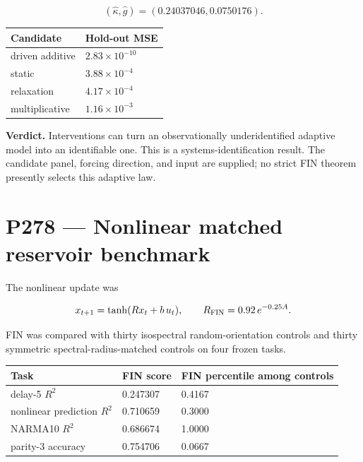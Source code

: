 \documentclass[11pt,a4paper,openany]{report}
\begin{document}
\[
(\widehat\kappa,\widehat g)
=
(0.24037046,0.0750176).
\]

\begin{center}
\begingroup\small
\setlength{\tabcolsep}{2.5pt}
\renewcommand{\arraystretch}{1.16}
\begin{longtable}{@{}p{}p{}@{}}
\toprule
\textbf{Candidate} & \textbf{Hold-out MSE} \\
\midrule
\endhead
driven additive & \(2.83\times10^{-10}\) \\
static & \(3.88\times10^{-4}\) \\
relaxation & \(4.17\times10^{-4}\) \\
multiplicative & \(1.16\times10^{-3}\) \\
\bottomrule
\end{longtable}
\endgroup
\end{center}

\textbf{Verdict.} Interventions can turn an observationally underidentified adaptive model into an identifiable one. This is a systems-identification result. The candidate panel, forcing direction, and input are supplied; no strict FIN theorem presently selects this adaptive law.

\chapter{P278 --- Nonlinear matched reservoir benchmark}

The nonlinear update was

\[
x_{t+1}
=
\tanh(Rx_t+b\,u_t),
\qquad
R_{\rm FIN}=0.92\,e^{-0.25A}.
\]

FIN was compared with thirty isospectral random-orientation controls and thirty symmetric spectral-radius-matched controls on four frozen tasks.

\begin{center}
\begingroup\small
\setlength{\tabcolsep}{2.5pt}
\renewcommand{\arraystretch}{1.16}
\begin{longtable}{@{}p{}p{}p{}@{}}
\toprule
\textbf{Task} & \textbf{FIN score} & \textbf{FIN percentile among controls} \\
\midrule
\endhead
delay-5 \(R^2\) & 0.247307 & 0.4167 \\
nonlinear prediction \(R^2\) & 0.710659 & 0.3000 \\
NARMA10 \(R^2\) & 0.686674 & 1.0000 \\
parity-3 accuracy & 0.754706 & 0.0667 \\
\bottomrule
\end{longtable}
\endgroup
\end{center}
\end{document}
